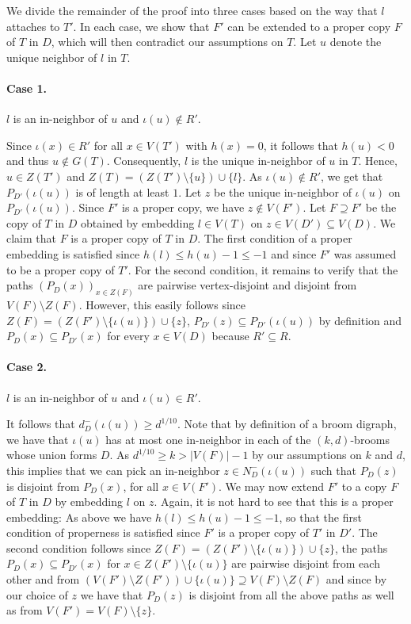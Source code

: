 \documentclass[a4paper,11pt]{article}
\makeatletter
\renewenvironment{proof}[1][\proofname] {\par\pushQED{\qed}\normalfont\topsep6\p@\@plus6\p@\relax\trivlist\item[\hskip\labelsep\bfseries#1\@addpunct{.}]\ignorespaces}{\popQED\endtrivlist\@endpefalse}
\theoremstyle{definition}
\makeatother
\begin{document}
\begin{proof}
We divide the remainder of the proof into three cases based on the way that $l$ attaches to $T'$. In each case, we show that $F'$ can be extended to a proper copy $F$ of $T$ in $D$, which will then contradict our assumptions on $T$. Let $u$ denote the unique neighbor of $l$ in $T$.
    \paragraph{\textbf{Case 1.}} $l$ is an in-neighbor of $u$ and $\iota(u)\notin R'$. 
    
    Since $\iota(x)\in R'$ for all $x\in V(T')$ with $h(x)=0$, it follows that $h(u)<0$ and thus $u\notin G(T)$. Consequently, $l$ is the unique in-neighbor of $u$ in $T$. Hence, $u\in Z(T')$ and $Z(T)=(Z(T')\setminus \{u\})\cup \{l\}$. As $\iota(u)\notin R'$, we get that $P_{D'}(\iota(u))$ is of length at least $1$. Let $z$ be the unique in-neighbor of $\iota(u)$ on $P_{D'}(\iota(u))$. Since $F'$ is a proper copy, we have $z\notin V(F')$. Let $F\supseteq F'$ be the copy of $T$ in $D$ obtained by embedding $l\in V(T)$ on $z\in V(D')\subseteq V(D)$. We claim that $F$ is a proper copy of $T$ in $D$. The first condition of a proper embedding is satisfied since $h(l)\le h(u)-1\le -1$ and since $F'$ was assumed to be a proper copy of $T'$. For the second condition, it remains to verify that the paths $(P_D(x))_{x\in Z(F)}$ are pairwise vertex-disjoint and disjoint from $V(F)\setminus Z(F)$. However, this easily follows since $Z(F)=(Z(F')\setminus \{\iota(u)\})\cup \{z\}$, $P_{D'}(z)\subseteq P_{D'}(\iota(u))$ by definition and $P_{D}(x)\subseteq P_{D'}(x)$ for every $x\in V(D)$ because $R'\subseteq R$. 
    \paragraph{\textbf{Case 2.}} $l$ is an in-neighbor of $u$ and $\iota(u)\in R'$.
    
    It follows that $d^-_{D}(\iota(u))\geq d^{1/10}$. Note that by definition of a broom digraph, we have that $\iota(u)$ has at most one in-neighbor in each of the $(k,d)$-brooms whose union forms $D$. As $d^{1/10}\geq k>|V(F)|-1$ by our assumptions on $k$ and $d$, this implies that we can pick an in-neighbor $z\in N^-_{D}(\iota(u))$ such that $P_{D}(z)$ is disjoint from $P_{D}(x)$, for all $x\in V(F')$. We may now extend $F'$ to a copy $F$ of $T$ in $D$ by embedding $l$ on $z$. Again, it is not hard to see that this is a proper embedding: As above we have $h(l)\le h(u)-1\le -1$, so that the first condition of properness is satisfied since $F'$ is a proper copy of $T'$ in $D'$. The second condition follows since $Z(F)=(Z(F')\setminus \{\iota(u)\})\cup \{z\}$, the paths $P_{D}(x)\subseteq P_{D'}(x)$ for $x\in Z(F')\setminus \{\iota(u)\}$ are pairwise disjoint from each other and from $(V(F')\setminus Z(F'))\cup\{\iota(u)\}\supseteq V(F)\setminus Z(F)$ and since by our choice of $z$ we have that $P_D(z)$ is disjoint from all the above paths as well as from $V(F')=V(F)\setminus \{z\}$. 

\end{proof}
\end{document}
